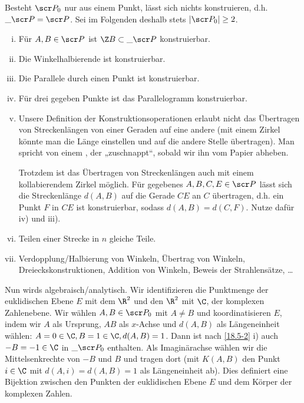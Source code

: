 Besteht $\scr P_0$ nur aus einem Punkt, lässt sich nichts konstruieren, d.h. $\_{\scr P} = \scr P$.
Sei im Folgenden deshalb stets $|\scr P_0| \ge 2$.


\begin{ex} \label{18.5-2}
	\begin{enumerate}[i)]
		\item
			Für $A, B \in \scr P$ ist $\Z B \subset \_{\scr P}$ konstruierbar.
		\item
			Die Winkelhalbierende ist konstruierbar.
		\item
			Die Parallele durch einen Punkt ist konstruierbar.
		\item
			Für drei gegeben Punkte ist das Parallelogramm konstruierbar.
		\item
			Unsere Definition der Konstruktionsoperationen erlaubt nicht das Übertragen von Streckenlängen von einer Geraden auf eine andere (mit einem Zirkel könnte man die Länge einstellen und auf die andere Stelle übertragen).
			Man spricht von einem , der „zuschnappt“, sobald wir ihn vom Papier abheben.

			Trotzdem ist das Übertragen von Streckenlängen auch mit einem kollabierendem Zirkel möglich.
			Für gegebenes $A, B, C, E \in \scr P$ lässt sich die Streckenlänge $d(A, B)$ auf die Gerade $CE$ an $C$ übertragen, d.h. ein Punkt $F$ in $CE$ ist konstruierbar, sodass $d(A, B) = d(C, F)$.
			Nutze dafür iv) und iii).
		\item
			Teilen einer Strecke in $n$ gleiche Teile.
		\item
			Verdopplung/Halbierung von Winkeln, Übertrag von Winkeln, Dreieckskonstruktionen, Addition von Winkeln, Beweis der Strahlensätze, \dots
	\end{enumerate}
\end{ex}

Nun wirds algebraisch/analytisch.
Wir identifizieren die Punktmenge der euklidischen Ebene $E$ mit dem $\R^2$ und den $\R^2$ mit $\C$, der komplexen Zahlenebene.
Wir wählen $A, B \in \scr P_0$ mit $A \neq B$ und koordinatisieren $E$, indem wir $A$ als Ursprung, $AB$ als $x$-Achse und $d(A,B)$ als Längeneinheit wählen: $A = 0 \in \C, B = 1 \in \C, d(A, B) = 1$.
Dann ist nach \ref{18.5-2} i) auch $-B = -1 \in \C$ in $\_{\scr P_0}$ enthalten.
Als Imaginärachse wählen wir die Mittelsenkrechte von $-B$ und $B$ und tragen dort (mit $K(A,B)$ den Punkt $i \in \C$ mit $d(A, i) = d(A, B) = 1$ als Längeneinheit ab).
Dies definiert eine Bijektion zwischen den Punkten der euklidischen Ebene $E$ und dem Körper der komplexen Zahlen.

